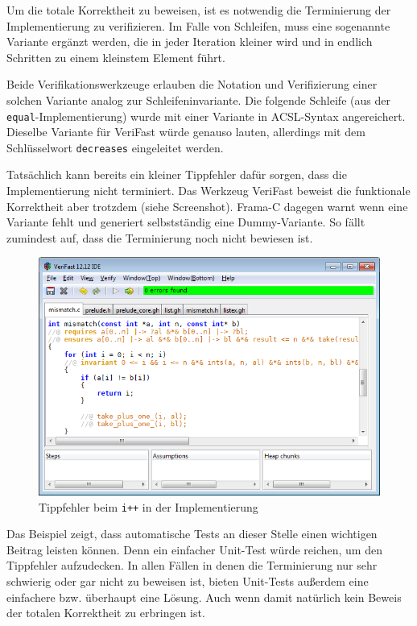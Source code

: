 Um die totale Korrektheit zu beweisen, ist es notwendig die Terminierung der Implementierung zu
verifizieren. Im Falle von Schleifen, muss eine sogenannte Variante ergänzt werden, die
in jeder Iteration kleiner wird und in endlich Schritten zu einem kleinstem Element führt.

Beide Verifikationswerkzeuge erlauben die Notation und Verifizierung einer solchen Variante analog zur
Schleifeninvariante. Die folgende Schleife (aus der \texttt{equal}-Implementierung) wurde mit einer Variante 
in ACSL-Syntax angereichert. Dieselbe Variante für VeriFast würde genauso lauten, allerdings
mit dem Schlüsselwort \texttt{decreases} eingeleitet werden.
\begin{figure}[H]

\end{figure}

Tatsächlich kann bereits ein kleiner Tippfehler dafür sorgen, dass die Implementierung
nicht terminiert. Das Werkzeug VeriFast beweist die funktionale Korrektheit aber trotzdem
(siehe Screenshot). Frama-C dagegen warnt wenn eine Variante fehlt und generiert selbstständig
eine Dummy-Variante. So fällt zumindest auf, dass die Terminierung noch nicht bewiesen ist.

\begin{figure}[H]
	\centering
\includegraphics[width=1.0\textwidth]{images/VeriFast-partial-correctness.png}
\caption{Tippfehler beim \texttt{i++} in der Implementierung}
\end{figure}

Das Beispiel zeigt, dass automatische Tests an dieser Stelle einen wichtigen Beitrag leisten
können. Denn ein einfacher Unit-Test würde reichen, um den Tippfehler aufzudecken. In allen
Fällen in denen die Terminierung nur sehr schwierig oder gar nicht zu beweisen ist, bieten
Unit-Tests außerdem eine einfachere bzw. überhaupt eine Lösung. Auch wenn damit natürlich
kein Beweis der totalen Korrektheit zu erbringen ist.

